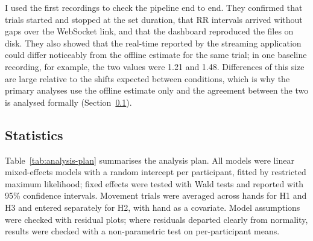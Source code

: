 I used the first recordings to check the pipeline end to end. They confirmed that trials started and stopped at the set duration, that RR intervals arrived without gaps over the WebSocket link, and that the dashboard reproduced the files on disk. They also showed that the real-time \al{} reported by the streaming application could differ noticeably from the offline estimate for the same trial; in one baseline recording, for example, the two values were 1.21 and 1.48. Differences of this size are large relative to the shifts expected between conditions, which is why the primary analyses use the offline estimate only and the agreement between the two is analysed formally (Section~\ref{sec:stats}).  

\subsection{Statistics}
\label{sec:stats}

Table~\ref{tab:analysis-plan} summarises the analysis plan. All models were linear mixed-effects models with a random intercept per participant, fitted by restricted maximum likelihood; fixed effects were tested with Wald tests and reported with 95\% confidence intervals. Movement trials were averaged across hands for H1 and H3 and entered separately for H2, with hand as a covariate. Model assumptions were checked with residual plots; where residuals departed clearly from normality, results were checked with a non-parametric test on per-participant means.

